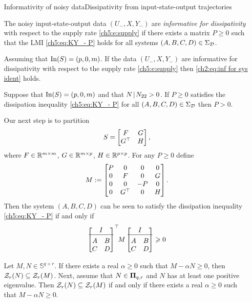 \documentclass[aspectratio=169, handout, 10pt, hyperref=colorlinks]{beamer}
\begin{document}
\begin{frame}[allowframebreaks]{Informativity of noisy data}{Dissipativity from input-state-output trajectories}
    \begin{definition}\label{ch5:def:info diss noisy}
    The noisy input-state-output data $(U_-,X,Y_-)$ are \emph{informative for dissipativity\/} with respect to the supply rate \eqref{ch5:e:supply} if there exists a matrix $P\geq 0$ such that the LMI \eqref{ch5:eq:KY_- P} holds for all systems $(A,B,C,D)\in\Sigma_{\mathcal{D}}$. 
    \end{definition}
    \begin{lem} \label{ch5:lem:necc noisy case} 
    Assuming that $\operatorname{In}(S)=(p,0,m)$. If the data $(U_- ,X,Y_- )$ are informative for dissipativity with respect to the supply rate \eqref{ch5:e:supply} then \ref{ch2:eq:inf for sys ident} holds.
    \end{lem}
    \begin{lem}
    \label{ch5:lem:P>0}
    Suppose that $\operatorname{In}(S)=(p,0,m)$ and that $N \!\mid\! N_{22} >0$. If $P \geq 0$ satisfies the dissipation inequality \eqref{ch5:eq:KY_- P} for all $(A,B,C,D) \in \Sigma_{\mathcal{D}}$ then $P > 0$. 
    \end{lem}
    Our next step is to partition 
    \begin{equation} \label{ch5:eq:partitionS}
    S=\begin{bmatrix} F & G\\G^\top & H\end{bmatrix},
    \end{equation}
    where  $F\in\mathbb{R}^{m\times m}$, $G\in\mathbb{R}^{m\times p}$, $H\in\mathbb{R}^{p\times p}$. For any $P \geq 0$ define
    \begin{equation} \label{ch5:eq:partitionM}
    M:=\begin{bmatrix}
    P & 0 & 0 & 0\\
    0 & F & 0 & G\\
    0 & 0 & -P & 0\\
    0 & G^\top & 0 & H
    \end{bmatrix}.
    \end{equation}
    Then the system $(A,B,C,D)$ can be seen to satisfy the dissipation inequality \eqref{ch5:eq:KY_- P} if and only if  
    \begin{equation}
    \label{ch5:eq:eqM1}
    \sysone^\top\!\! M \sysone \geq 0
    \end{equation} 
    \begin{theorem}
    \label{t:nonstrictS-lemma}
    Let $M,N \in \mathbb{S}^{q+r}$. If there exists a real $\alpha \geq 0$ such that $M - \alpha N \geq 0$, then $\mathcal{Z}_r(N) \subseteq \mathcal{Z}_r(M)$. Next, assume that $N \in \mathbf{\Pi}_{q,r}$ and $N$ has at least one positive eigenvalue. Then $\mathcal{Z}_r(N) \subseteq \mathcal{Z}_r(M)$ if and only if there exists a real $\alpha \geq 0$ such that $M-\alpha N \geq 0$. 

\end{theorem}
\end{frame}
\end{document}
